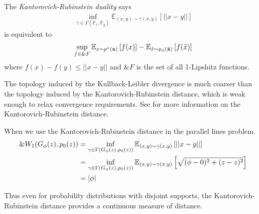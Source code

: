 \begin{theorem} The \textit{Kantorovich-Rubinstein duality} says
  \begin{align}
    \inf_{\gamma \in \Gamma(\mathbb{P}_r,
    \mathbb{P}_g)}\mathbb{E}_{(x,y) \sim \gamma(x, y)} \left[ || x-y
    || \right]
  \end{align}
  is equivalent to
  \begin{align} \sup_{f \in \&{F}} \mathbb{E}_{x \sim p^*(\mathbf{x})}\left[ f(x)
    \right] - \mathbb{E}_{\tilde{x} \sim p_{\phi}(\tilde{\mathbf{x}})}\left[ f(\tilde{x}) \right]
  \end{align}
  where $f(x) - f(y) \leq ||x-y||$ and $\&{F}$ is the set of all
  1-Lipshitz functions.
\end{theorem}

The topology induced by the Kullback-Leibler divergence is much
coarser than the topology induced by the Kantorovich-Rubinstein
distance, which is weak enough to relax convergence requirements. See
\cite{ref:villani-2008} for more information on the
Kantorovich-Rubinstein distance.

\begin{example}
  When we use the Kantorovich-Rubinstein distance in the parallel lines problem.
  \begin{align} \&W_1(G_\phi(z), p_0(z)) & = \inf_{\gamma \in \Gamma(G_\phi(z),
                                       p_0(z))}\mathbb{E}_{(x,y) \sim \gamma(x, y)} \left[ || x-y || \right]
    \\
                                     & =\inf_{\gamma \in \Gamma(G_\phi(z), p_0(z))}\mathbb{E}_{(x,y) \sim
                                       \gamma(x, y)} \left[ \sqrt{(\phi - 0)^2 + (z - z)^2} \right] \\ & =
                                                                                                         |\phi|
  \end{align}
\end{example}

Thus even for probability distributions with disjoint supports, the
Kantorovich-Rubinstein distance provides a continuous measure of
distance.

